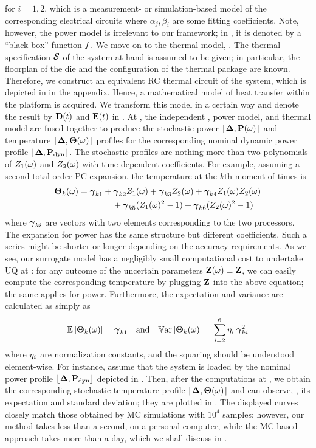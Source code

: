 for $i = 1, 2$, which is a measurement- or simulation-based model of the corresponding electrical circuits where $\alpha_j, \beta_i$ are some fitting coefficients. Note, however, the power model is irrelevant to our framework; in , it is denoted by a ``black-box'' function $f$. We move on to the thermal model, . The thermal specification $\mathcal{S}$ of the system at hand is assumed to be given; in particular, the floorplan of the die and the configuration of the thermal package are known. Therefore, we construct an equivalent RC thermal circuit of the system, which is depicted in  in the appendix. Hence, a mathematical model of heat transfer within the platform is acquired. We transform this model in a certain way and denote the result by $\mCF(\t)$ and $\mCS(\t)$ in . At , the independent \rvs, power model, and thermal model are fused together to produce the stochastic power $\profP{\o}$ and temperature $\profT{\o}$ profiles for the corresponding nominal dynamic power profile $\profPdyn$. The stochastic profiles are nothing more than two polynomials of $Z_1(\omega)$ and $Z_2(\omega)$ with time-dependent coefficients. For example, assuming a second-total-order PC expansion, the temperature at the $k$th moment of times is
\begin{align*}
  {\boldsymbol\Theta}_k(\omega) &= {\boldsymbol\gamma}_{k1} + {\boldsymbol\gamma}_{k2} Z_1(\omega) + {\boldsymbol\gamma}_{k3} Z_2(\omega) + {\boldsymbol\gamma}_{k4} Z_1(\omega) Z_2(\omega) \\
  & \qquad \qquad {} + {\boldsymbol\gamma}_{k5} (Z_1(\omega)^2 - 1) + {\boldsymbol\gamma}_{k6} (Z_2(\omega)^2 - 1)
\end{align*}
where ${\boldsymbol\gamma}_{ki}$ are vectors with two elements corresponding to the two processors. The expansion for power has the same structure but different coefficients. Such a series might be shorter or longer depending on the accuracy requirements. As we see, our surrogate model has a negligibly small computational cost to undertake UQ at : for any outcome of the uncertain parameters $\mathbf{Z}(\omega) \equiv \mathbf{Z}$, we can easily compute the corresponding temperature by plugging $\mathbf{Z}$ into the above equation; the same applies for power. Furthermore, the expectation and variance are calculated as simply as
\[
  \mathbb{E}\left[{\boldsymbol\Theta}_k(\omega)\right] = {\boldsymbol\gamma}_{k1} \hspace{1em} \text{and} \hspace{1em} \mathbb{V}\text{ar}\left[{\boldsymbol\Theta}_k(\omega)\right] = \sum_{i = 2}^{6} \eta_i \: {\boldsymbol\gamma}_{ki}^2
\]
where $\eta_i$ are normalization constants, and the squaring should be understood element-wise. For instance, assume that the system is loaded by the nominal power profile $\profPdyn$ depicted in . Then, after the computations at , we obtain the corresponding stochastic temperature profile $\profT{\o}$ and can observe, \eg, its expectation and standard deviation; they are plotted in . The displayed curves closely match those obtained by MC simulations with $10^4$ samples; however, our method takes less than a second, on a personal computer, while the MC-based approach takes more than a day, which we shall discuss in .
